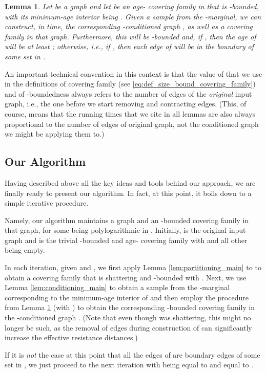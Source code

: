 \documentclass[11pt, letterpaper]{article}
\newtheorem{lemma}[theorem]{Lemma}
\begin{document}
\begin{lemma}
\label{lem:conditioning_progress}
Let  be a graph and let  be an age- covering family in  that is -bounded, with its minimum-age interior being . Given a sample  from the -marginal, we can construct, in  time, the corresponding -conditioned graph , as well as a covering family  in that graph. Furthermore, this  will be -bounded and, if , then the age of  will be at least ; otherwise, i.e., if , then each edge of  will be in the boundary  of some set  in .
\end{lemma}
An important technical convention in this context is that the value of  that we use in the definitions of covering family (see \eqref{eq:def_size_bound_covering_family}) and of -boundedness always refers to the number of edges of the {\em original} input graph, i.e., the one before we start removing and contracting edges. (This, of course, means that the running times that we cite in all lemmas are also always proportional to the number of edges of original graph, not the conditioned graph we might be applying them to.)

\subsection{Our Algorithm}\label{sec:algorithm_wrapup}

Having described above all the key ideas and tools behind our approach, we are finally ready to present our algorithm. In fact, at this point, it boils down to a simple iterative procedure.

Namely, our algorithm maintains a graph  and an -bounded covering family  in that graph, for some  being polylogarithmic in . Initially,  is the original input graph and  is the trivial -bounded and age- covering family with  and all other  being empty. 

In each iteration, given  and , we first apply Lemma \ref{lem:partitioning_main} to  to obtain a covering family  that is shattering and -bounded with . Next, we use Lemma \ref{lem:conditioning_main} to obtain a sample  from the -marginal corresponding to the minimum-age interior  of  and then employ the procedure from Lemma \ref{lem:conditioning_progress} (with ) to obtain the corresponding -bounded covering family  in the -conditioned graph . (Note that even though  was shattering, this  might no longer be such, as the removal of edges during construction of  can significantly increase the effective resistance distances.) 

If it is {\em not} the case at this point that all the edges of  are boundary edges of some set in , we just proceed to the next iteration with  being equal to  and  equal to . 
\end{document}
